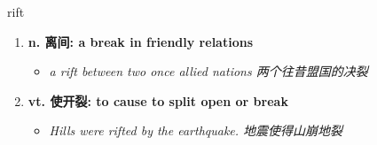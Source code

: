 
\begin{frame}
{\huge rift}
\begin{center}
\begin{enumerate}\Large
  \item \textbf{n. 离间: a break in friendly relations}
  \begin{itemize}
    \item \em{\Large{a rift between two once allied nations 两个往昔盟国的决裂}}
  \end{itemize}
  \item \textbf{vt. 使开裂: to cause to split open or break}
  \begin{itemize}
    \item \em{\Large{Hills were rifted by the earthquake. 地震使得山崩地裂}}
  \end{itemize}
\end{enumerate}
\end{center}
\end{frame}
